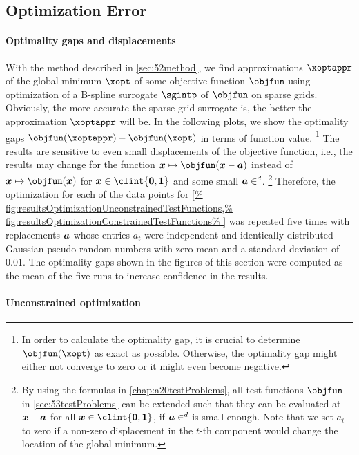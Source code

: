 \subsection{Optimization Error}
\label{sec:542optimization}

\paragraph{Optimality gaps and displacements}

With the method described in \cref{sec:52method},
we find approximations $\xoptappr$ of the
global minimum $\xopt$ of some objective function $\objfun$
using optimization of a B-spline surrogate $\sgintp$ of $\objfun$
on sparse grids.
Obviously, the more accurate the sparse grid surrogate is,
the better the approximation $\xoptappr$ will be.
In the following plots,
we show the optimality gaps $\objfun(\xoptappr) - \objfun(\xopt)$
in terms of function value.%
\footnote{%
  In order to calculate the optimality gap,
  it is crucial to determine $\objfun(\xopt)$ as exact as possible.
  Otherwise, the optimality gap might either not converge to zero
  or it might even become negative.%
}
The results are sensitive to even small displacements
of the objective function, i.e.,
the results may change for the
function $\*x \mapsto \objfun(\*x - \*a)$
instead of $\*x \mapsto \objfun(\*x)$ for $\*x \in \clint{\*0, \*1}$
and some small $\*a \in \real^d$.%
\footnote{%
  By using the formulas in \cref{chap:a20testProblems},
  all test functions $\objfun$ in \cref{sec:53testProblems}
  can be extended such that they can be evaluated at ${\boldsymbol{x}} - {\boldsymbol{a}}$
  for all $\*x \in \clint{\*0, \*1}$, if $\*a \in \real^d$ is small enough.
  Note that we set $a_t$ to zero if a non-zero displacement in
  the $t$-th component would change the location of the global minimum.%
}
Therefore, the optimization for each of the
data points for \cref{%
  fig:resultsOptimizationUnconstrainedTestFunctions,%
  fig:resultsOptimizationConstrainedTestFunctions%
}
was repeated five times with replacements ${\boldsymbol{a}}$
whose entries $a_t$ were independent and identically distributed Gaussian
pseudo-random numbers with zero mean and a standard deviation of $0.01$.
The optimality gaps shown in the figures of this section were computed
as the mean of the five runs to increase confidence in the results.

\paragraph{Unconstrained optimization}

